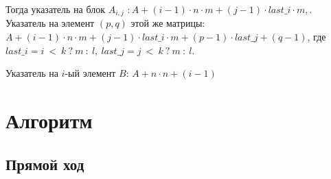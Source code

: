 \documentclass[12pt]{report}
\begin{document}
        Тогда указатель на блок $A_{i, j}$ $: A + (i - 1) \cdot n \cdot m + (j - 1) \cdot last\_i \cdot m,$. \\
        Указатель на элемент $(p,q)$ этой же матрицы: $A + (i - 1) \cdot n \cdot m + (j - 1) \cdot last\_i \cdot m + (p - 1) \cdot last\_j + (q - 1)$,
        где $ last\_i = i\ <\ k\ ?\ m\ :\ l,\ last\_j = j\ <\ k\ ?\ m\ :\ l$.
        
        Указатель на $i$-ый элемент $B$: $A + n \cdot n + (i - 1)$

    \section{Алгоритм} \label{lin:alg}
        \subsection{Прямой ход}
\end{document}
